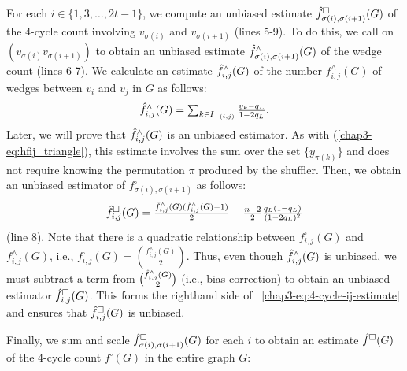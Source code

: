 For each $i \in \{1, 3, \ldots, 2t-1\}$, we compute an unbiased estimate $\hat{f}_{\sigma(i),
\sigma(i+1)}^\square(G)$ of the 4-cycle count involving $v_{\sigma(i)}$ and $v_{\sigma(i+1)}$ (lines 5-9). 
To do this, 
we call \AlgWS{} on
$(v_{\sigma(i)} v_{\sigma(i+1)})$ to obtain an unbiased estimate $\hat{f}_{\sigma(i),
\sigma(i+1)}^\wedge(G)$ of the wedge count (lines 6-7). 
We calculate an estimate $\hat{f}_{i,j}^\wedge(G)$ of the number $f_{i,j}^\wedge(G)$ of wedges between $v_i$ and $v_j$ in $G$ as follows:
\begin{equation}\label{chap3-eq:wedge-estimate}
  \textstyle{\hat{f}^\wedge_{i,j}(G) = \sum_{k \in I_{-(i,j)}} \frac{y_k - q_L}{1-2q_L}.}
\end{equation}
Later, we will prove that $\hat{f}^\wedge_{i,j}(G)$ is an unbiased estimator. 
As with (\ref{chap3-eq:hfij_triangle}), this estimate involves the sum over the set $\{y_{\pi(k)}\}$ and does not require knowing the permutation $\pi$ produced by the shuffler. 
Then, we obtain an unbiased estimator of $f_{\sigma(i), \sigma(i+1)}^\square$ as follows:
\begin{equation}\label{chap3-eq:4-cycle-ij-estimate}
  \textstyle{\hat{f}_{i,j}^\square(G) = \frac{\hat{f}^\wedge_{i, j}(G)(\hat{f}^\wedge_{i, j}(G)-1)}{2} - \frac{n-2}{2}\frac{q_L(1-q_L)}{(1-2q_L)^2}}
\end{equation}
(line 8). 
Note that 
there is a quadratic relationship between $f_{i, j}^\square(G)$ and $f_{i, j}^\wedge(G)$, i.e., $f_{i, j}^\square(G) = \binom{f_{i, j}^\wedge(G)}{2}$. 
Thus, 
even though $\hat{f}_{i, j}^\wedge(G)$ is unbiased, 
we must subtract a term from $\binom{\hat{f}_{i, j}^\wedge(G)}{2}$ (i.e., bias correction) to obtain an unbiased estimator $\hat{f}_{i, j}^\square(G)$. 
This forms the righthand side of
~\eqref{chap3-eq:4-cycle-ij-estimate} and ensures that $\hat{f}_{i,j}^\square(G)$ is unbiased. 

Finally, 
we sum and scale 
$\hat{f}_{\sigma(i), \sigma(i+1)}^\square(G)$ for each $i$ to obtain an estimate $\hat{f}^\square(G)$ of the 4-cycle count $f^\square(G)$ in the entire graph $G$: 

